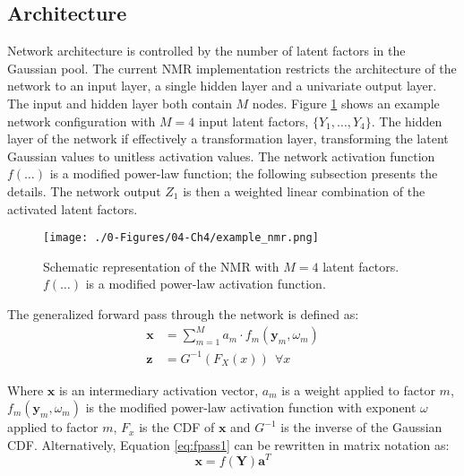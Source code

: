 \subsection{Architecture}
\label{subsec:arch}

Network architecture is controlled by the number of latent factors in the Gaussian pool. The current \gls{NMR} implementation restricts the architecture of the network to an input layer, a single hidden layer and a univariate output layer. The input and hidden layer both contain $M$ nodes. Figure \ref{fig:example_nmr} shows an example network configuration with $M=4$ input latent factors, $\{ Y_{1}, \dots, Y_{4}\}$. The hidden layer of the network if effectively a transformation layer, transforming the latent Gaussian values to unitless activation values. The network activation function $f(\dots)$ is a modified power-law function; the following subsection presents the details. The network output $Z_{1}$ is then a weighted linear combination of the activated latent factors.

\begin{figure}[htb!]
    \centering
    \texttt{[image: ./0-Figures/04-Ch4/example\_nmr.png]}
    \caption{Schematic representation of the \gls{NMR} with $M=4$ latent factors. $f(\dots)$ is a modified power-law activation function. }
    \label{fig:example_nmr}
\end{figure}

The generalized forward pass through the network is defined as:
\begin{align}
    \label{eq:fpass1}
    \mathbf{x} & = \sum_{m=1}^{M}a_{m} \cdot f_{m}(\mathbf{y}_{m}, \omega_{m}) \\
    \label{eq:fpass2}
    \mathbf{z} & = G^{-1}\left( F_{X}\left(x \right)\right) \ \  \forall x
\end{align}

Where $\mathbf{x}$ is an intermediary activation vector, $a_{m}$ is a weight applied to factor $m$, $f_{m}(\mathbf{y}_{m}, \omega_{m})$ is the modified power-law activation function with exponent $\omega$ applied to factor $m$, $F_{x}$ is the \gls{CDF} of $\mathbf{x}$ and $G^{-1}$ is the inverse of the Gaussian \gls{CDF}. Alternatively, Equation \ref{eq:fpass1} can be rewritten in matrix notation as:
\begin{equation}
    \mathbf{x} = f\left( \mathbf{Y} \right) \mathbf{a}^{T}
    \label{eq:fpass3}
\end{equation}

